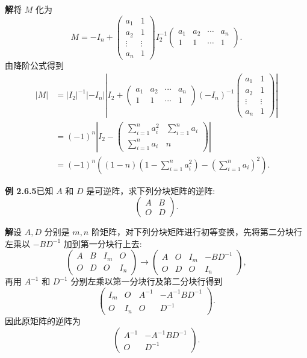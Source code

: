 \documentclass[UTF8,12pt,a4paper,fontset=fandol]{ctexart}
\begin{document}
\noindent\textbf{解}\quad 将 $M$ 化为
\[
M=-I_n+
\left(\begin{array}{cc}
a_1 & 1\\
a_2 & 1\\
\vdots & \vdots\\
a_n & 1
\end{array}\right)
I_2^{-1}
\left(\begin{array}{cccc}
a_1 & a_2 & \cdots & a_n\\
1 & 1 & \cdots & 1
\end{array}\right).
\]
由降阶公式得到
\[
\begin{aligned}
|M|
&=|I_2|^{-1}|-I_n|\left|I_2+
\left(\begin{array}{cccc}
a_1 & a_2 & \cdots & a_n\\
1 & 1 & \cdots & 1
\end{array}\right)(-I_n)^{-1}
\left(\begin{array}{cc}
a_1 & 1\\
a_2 & 1\\
\vdots & \vdots\\
a_n & 1
\end{array}\right)\right|\\
&=(-1)^n\left|I_2-
\left(\begin{array}{cc}
\sum\limits_{i=1}^n a_i^2 & \sum\limits_{i=1}^n a_i\\
\sum\limits_{i=1}^n a_i & n
\end{array}\right)\right|\\
&=(-1)^n\left((1-n)\left(1-\sum\limits_{i=1}^n a_i^2\right)-\left(\sum\limits_{i=1}^n a_i\right)^2\right).
\end{aligned}
\]

\noindent\textbf{例 2.6.5}\quad 已知 $A$ 和 $D$ 是可逆阵，求下列分块矩阵的逆阵:
\[
\left(\begin{array}{cc}
A & B\\
O & D
\end{array}\right).
\]

\noindent\textbf{解}\quad 设 $A,D$ 分别是 $m,n$ 阶矩阵，对下列分块矩阵进行初等变换，先将第二分块行左乘以 $-BD^{-1}$ 加到第一分块行上去:
\[
\left(\begin{array}{cc|cc}
A & B & I_m & O\\
O & D & O & I_n
\end{array}\right)\longrightarrow
\left(\begin{array}{cc|cc}
A & O & I_m & -BD^{-1}\\
O & D & O & I_n
\end{array}\right),
\]
再用 $A^{-1}$ 和 $D^{-1}$ 分别左乘以第一分块行及第二分块行得到
\[
\left(\begin{array}{cc|cc}
I_m & O & A^{-1} & -A^{-1}BD^{-1}\\
O & I_n & O & D^{-1}
\end{array}\right).
\]
因此原矩阵的逆阵为
\[
\left(\begin{array}{cc}
A^{-1} & -A^{-1}BD^{-1}\\
O & D^{-1}
\end{array}\right).
\]
\end{document}
